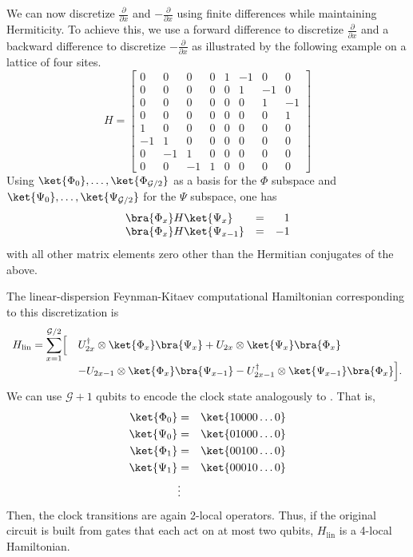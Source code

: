 \documentclass[11pt]{article}
\begin{document}
We can now discretize $\frac{\partial}{\partial x}$ and $-\frac{\partial}{\partial x}$ using finite differences while maintaining Hermiticity. To achieve this, we use a forward difference to discretize $\frac{\partial}{\partial x}$ and a backward difference to discretize $-\frac{\partial}{\partial x}$ as illustrated by the following example on a lattice of four sites.
\begin{equation}
\label{symplect}
H = \left[ \begin{array}{rrrrrrrr}
0 & 0 & 0 & 0 & 1 & -1 & 0 & 0 \\
0 & 0 & 0 & 0 & 0 & 1 & -1 & 0 \\
0 & 0 & 0 & 0 & 0 & 0 & 1 & -1 \\
0 & 0 & 0 & 0 & 0 & 0 & 0 & 1 \\
1 & 0 & 0 & 0 & 0 & 0 & 0 & 0 \\
-1 & 1 & 0 & 0 & 0 & 0 & 0 & 0 \\
0 & -1 & 1 & 0 & 0 & 0 & 0 & 0 \\
0 & 0 & -1 & 1 & 0 & 0 & 0 & 0
\end{array} \right]
\end{equation}
Using $\ket{\Phi_0}, \ldots, \ket{\Phi_{\mathcal{G}/2}}$ as a basis for the $\Phi$ subspace and $\ket{\Psi_0}, \ldots, \ket{\Psi_{\mathcal{G}/2}}$ for the $\Psi$ subspace, one has
\begin{equation}
\begin{array}{lcr}
\bra{\Phi_x} H \ket{\Psi_x} & = & 1 \\
\bra{\Phi_x} H \ket{\Psi_{x-1}} & = & -1
\end{array}
\end{equation}
with all other matrix elements zero other than the Hermitian conjugates of the above.

The linear-dispersion Feynman-Kitaev computational Hamiltonian corresponding to this discretization is
\begin{equation}
\begin{array}{rl} H_{\mathrm{lin}} = \displaystyle{\sum_{x = 1}^{\mathcal{G}/2}} \Big[ & U_{2x}^\dag \otimes \ket{\Phi_x} \bra{\Psi_x} + U_{2x} \otimes \ket{\Psi_x} \bra{\Phi_x} \\
 & -  U_{2x-1} \otimes \ket{\Phi_x} \bra{\Psi_{x-1}} - U^\dag_{2x-1} \otimes \ket{\Psi_{x-1}} \bra{\Phi_x} \Big].
\end{array}
\end{equation}
We can use $\mathcal{G}+1$ qubits to encode the clock state analogously to . That is,
\begin{eqnarray*}
\ket{\Phi_0} & = & \ket{10000\ldots0} \\
\ket{\Psi_0} & = & \ket{01000\ldots0} \\
\ket{\Phi_1} & = & \ket{00100\ldots0} \\
\ket{\Psi_1} & = & \ket{00010\ldots0} \\
& \vdots & 
\end{eqnarray*}
Then, the clock transitions are again 2-local operators. Thus, if the original circuit is built from gates that each act on at most two qubits, $H_{\mathrm{lin}}$ is a 4-local Hamiltonian.
\end{document}
